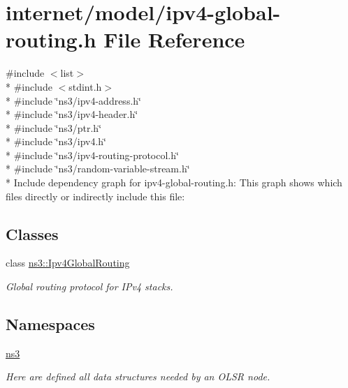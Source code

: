 \hypertarget{ipv4-global-routing_8h}{}\section{internet/model/ipv4-\/global-\/routing.h File Reference}
\label{ipv4-global-routing_8h}
{\ttfamily \#include $<$list$>$}\\*
{\ttfamily \#include $<$stdint.\+h$>$}\\*
{\ttfamily \#include \char`\"{}ns3/ipv4-\/address.\+h\char`\"{}}\\*
{\ttfamily \#include \char`\"{}ns3/ipv4-\/header.\+h\char`\"{}}\\*
{\ttfamily \#include \char`\"{}ns3/ptr.\+h\char`\"{}}\\*
{\ttfamily \#include \char`\"{}ns3/ipv4.\+h\char`\"{}}\\*
{\ttfamily \#include \char`\"{}ns3/ipv4-\/routing-\/protocol.\+h\char`\"{}}\\*
{\ttfamily \#include \char`\"{}ns3/random-\/variable-\/stream.\+h\char`\"{}}\\*
Include dependency graph for ipv4-\/global-\/routing.h\+:
This graph shows which files directly or indirectly include this file\+:
\subsection*{Classes}
\begin{DoxyCompactItemize}
\item 
class \hyperlink{classns3_1_1Ipv4GlobalRouting}{ns3\+::\+Ipv4\+Global\+Routing}
\begin{DoxyCompactList}\small\item\em Global routing protocol for I\+Pv4 stacks. \end{DoxyCompactList}\end{DoxyCompactItemize}
\subsection*{Namespaces}
\begin{DoxyCompactItemize}
\item 
 \hyperlink{namespacens3}{ns3}
\begin{DoxyCompactList}\small\item\em Here are defined all data structures needed by an O\+L\+SR node. \end{DoxyCompactList}\end{DoxyCompactItemize}
